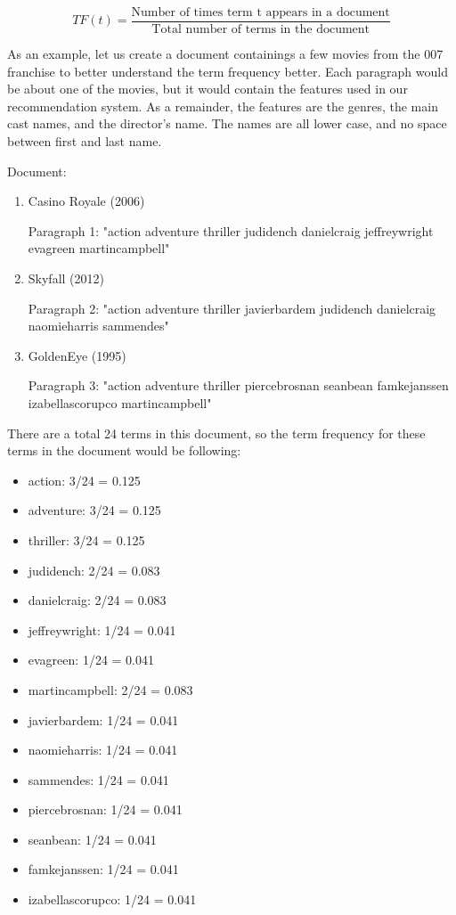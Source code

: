 \begin{equation}
TF (t) = \frac{\text{Number of times term t appears in a document}}{\text{Total number of terms in the document}}
\end{equation}

As an  example,  let us create a document containings a few movies from the 007 franchise to better understand the term frequency better. Each paragraph would be about one of the movies, but it would contain the features used in our recommendation system. As a remainder, the features are the genres, the main cast names, and the director’s name. The names are all lower case, and no space between first and last name.

Document: 

\begin{enumerate}
\item Casino Royale (2006)

Paragraph 1: "action adventure thriller judidench danielcraig jeffreywright evagreen martincampbell" 

\item Skyfall (2012)

Paragraph 2: "action adventure thriller javierbardem judidench danielcraig naomieharris sammendes" 

\item GoldenEye (1995)

Paragraph 3: "action adventure thriller piercebrosnan seanbean famkejanssen izabellascorupco martincampbell"
\end{enumerate}

There are a total 24 terms in this document, so the term frequency for these terms in the document would be following:

\begin{itemize}
\item action: 			3/24	=	0.125
\item adventure: 		3/24	=	0.125 
\item thriller: 			3/24	=	0.125
\item judidench: 		2/24	=	0.083
\item danielcraig: 		2/24	=	0.083
\item jeffreywright: 		1/24	=	0.041
\item evagreen: 		1/24	=	0.041
\item martincampbell: 	2/24	=	0.083
\item javierbardem: 		1/24	=	0.041
\item naomieharris: 		1/24	=	0.041
\item sammendes: 		1/24	=	0.041
\item piercebrosnan: 		1/24	=	0.041
\item seanbean: 		1/24	=	0.041
\item famkejanssen: 		1/24	=	0.041
\item izabellascorupco: 	1/24	=	0.041
\end{itemize}


